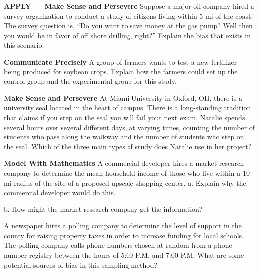 \documentclass{article}
\newenvironment{practice}[2]{}{}        %
\newcommand{\answer}[1]{}               %
\begin{document}
\begin{practice}{15}{2}
\textbf{APPLY — Make Sense and Persevere} Suppose a major oil company hired a survey organization to conduct a study of citizens living within 5 mi of the coast.
The survey question is, ``Do you want to save money at the gas pump? Well then you would be in favor of off shore drilling, right?''
Explain the bias that exists in this scenario.
\answer{The bias is in the question. The experimenters only provided those surveyed with a benefit of offshore drilling; however, they failed to inform the participants of the cons.}
\end{practice}
\begin{practice}{16}{2}
\textbf{Communicate Precisely} A group of farmers wants to test a new fertilizer being produced for soybean crops. Explain how the farmers could set up the control group and the experimental group for this study.
\answer{Control group—use the same growing techniques as before; Experimental group—use the new fertilizer}
\end{practice}
\begin{practice}{17}{2}
\textbf{Make Sense and Persevere} At Miami University in Oxford, OH, there is a university seal located in the heart of campus. There is a long-standing tradition that claims if you step on the seal you will fail your next exam.
Natalie spends several hours over several different days, at varying times, counting the number of students who pass along the walkway and the number of students who step on the seal. Which of the three main types of study does Natalie use in her project?
\answer{observational study}
\end{practice}
\begin{practice}{18}{2}
\textbf{Model With Mathematics} A commercial developer hires a market research company to determine the mean household income of those who live within a 10 mi radius of the site of a proposed upscale shopping center.
a. Explain why the commercial developer would do this.
\answer{a. Since it says the proposed site of an ``upscale'' shopping center, the developer wants to be sure the people in the surrounding area will have enough money to spend at this type of venue.}
b. How might the market research company get the information?
\answer{b. The market research company will have to use demographic data provided by the federal government.}
\end{practice}
\begin{practice}{19}{2}
A newspaper hires a polling company to determine the level of support in the county for raising property taxes in order to increase funding for local schools. The polling company calls phone numbers chosen at random from a phone number registry between the hours of 5:00 P.M. and 7:00 P.M. What are some potential sources of bias in this sampling method?
\answer{Calling between the hours of 5:00 and 7:00 may exclude households with people who work during that time. Calling numbers from a phone registry will exclude households that are not listed.}
\end{practice}
\end{document}
